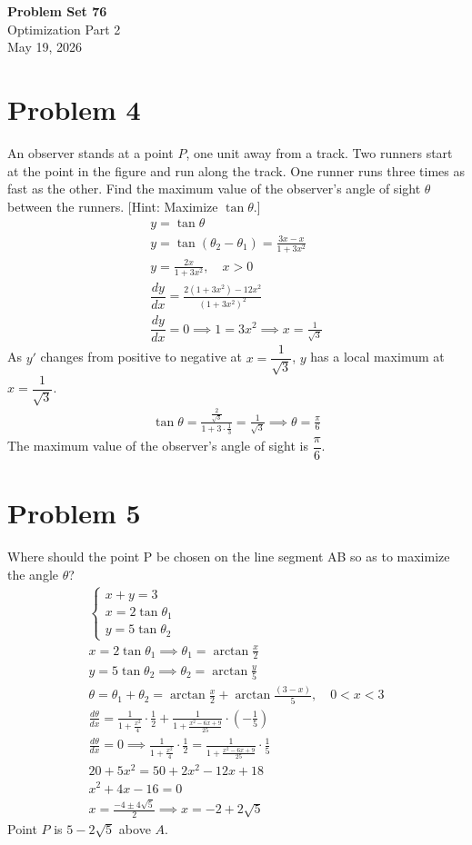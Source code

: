 \documentclass[12pt]{article}
\newcommand{\dydx}{\dfrac{dy}{dx}}
\newcommand{\problem}[1]{\section{Problem #1}}
\begin{document}
\vspace*{0cm}

\begin{center}
    {\Large \bfseries Problem Set 76} \\[0.5cm]
    {\large Optimization Part 2} \\[0.35cm]
    {\normalsize May 19, 2026}
\end{center}


\problem{4}
 An observer stands at a point $P$, one unit away from a track. Two runners start at the point in the
figure and run along the track. One runner runs three times as fast as the other. Find the maximum
value of the observer’s angle of sight $\theta$ between the runners. [Hint: Maximize $\tan \theta$.]
\begin{gather*}
    y=\tan \theta\\
    y=\tan (\theta_2-\theta _1)=\frac{3x-x}{1+3x^2}\\
    y=\frac{2x}{1+3x^2},\quad x>0\\
    \dydx=\frac{2(1+3x^2)-12x^2}{(1+3x^2)^2}\\
    \dydx =0 \implies 1=3x^2 \implies \boxed{x=\frac{1}{\sqrt{3}}}
\end{gather*}
As $y'$ changes from positive to negative at $x=\dfrac{1}{\sqrt{3}}$, $y$ has a local maximum at $x=\dfrac{1}{\sqrt{3}}$.
\begin{gather*}
    \tan \theta = \frac{\frac{2}{\sqrt{3}}}{1+3\cdot \frac{1}{3}}=\frac{1}{\sqrt{3}}\implies \boxed{\theta = \frac{\pi}{6}}
\end{gather*}
The maximum value of the observer's angle of sight is $\dfrac{\pi}{6}$.

\problem{5}
 Where should the point P be chosen on the line segment AB so as to maximize the angle $\theta$?
 \begin{gather*}
     \begin{cases}
         x+y=3\\
         x=2\tan \theta _1\\
         y=5\tan \theta_2
     \end{cases}\\
     x=2\tan \theta _1  \implies \theta_1=\arctan \frac{x}{2}\\
     y=5\tan \theta_2 \implies \theta_2 = \arctan \frac{y}{5}\\
     \theta = \theta_1+\theta_2 = \arctan \frac{x}{2}+ \arctan \frac{(3-x)}{5}, \quad 0<x<3\\
     \frac{d\theta}{dx}=\frac{1}{1+\frac{x^2}{4}}\cdot \frac{1}{2}+\frac{1}{1+\frac{x^2-6x+9}{25}}\cdot (-\frac{1}{5})\\ 
     \frac{d\theta}{dx}=0 \implies \frac{1}{1+\frac{x^2}{4}}\cdot \frac{1}{2}=\frac{1}{1+\frac{x^2-6x+9}{25}}\cdot \frac{1}{5}\\
     20+5x^2=50+2x^2-12x+18\\
     x^2+4x-16=0\\
     x=\frac{-4\pm 4\sqrt{5}}{2} \implies \boxed{x=-2+2\sqrt{5}}
 \end{gather*}
 Point $P$ is $5-2\sqrt{5}$ above $A$.
\end{document}
